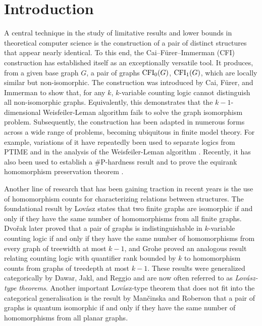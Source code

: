 \documentclass[11pt]{article}
\begin{document}
\section{Introduction}
A central technique in the study of limitative results and lower bounds in theoretical computer science is the construction of a pair of distinct structures that appear nearly identical.
To this end, the Cai–Fürer–Immerman (CFI) construction has established itself as an exceptionally versatile tool.
It produces, from a given base graph $G$, a pair of graphs $\operatorname{CFI}_0(G)$, $\operatorname{CFI}_1(G)$, which are locally similar but non-isomorphic.
The construction was introduced by Cai, Fürer, and Immerman \cite{cai1992optimal} to show that, for any $k$, $k$-variable counting logic cannot distinguish all non-isomorphic graphs.
Equivalently, this demonstrates that the $k-1$-dimensional Weisfeiler-Leman algorithm fails to solve the graph isomorphism problem.
Subsequently, the construction has been adapted in numerous forms across a wide range of problems, becoming ubiquitous in finite model theory.
For example, variations of it have repeatedly been used to separate logics from \textsf{PTIME} \cite{Dawar2007thepowerofcounting,gradel2019rank,lichter2023separating} and in the analysis of the Weisfeiler-Leman algorithm \cite{Furer2001weisfeiler, FUHLBRUCK202196, grohe2025compressing}. Recently, it has also been used to establish a \textsf{\#P}-hardness result \cite{DBLP:conf/soda/Curticapean24} and to prove the equirank homomorphism preservation theorem \cite{rossman:LIPIcs.CSL.2025.6}.
\par 
Another line of research that has been gaining traction in recent years is the use of homomorphism counts for characterizing relations between structures. The foundational result by Lovász \cite{lovasz1967operations} states that two finite graphs are isomorphic if and only if they have the same number of homomorphisms from all finite graphs. Dvořak \cite{dvovrak2010recognizing} later proved that a pair of graphs is indistinguishable in $k$-variable counting logic if and only if they have the same number of homomorphisms from every graph of treewidth at most $k-1$, and Grohe \cite{grohe2020counting} proved an analogous result relating counting logic with quantifier rank bounded by $k$ to homomorphism counts from graphs of treedepth at most $k-1$. These results were generalized categorically by Dawar, Jakl, and Reggio \cite{Dawar2021Lovasztype} and are now often referred to as \emph{Lovász-type theorems}. 
Another important Lovász-type theorem that does not fit into the categorical generalisation is the result by Mančinska and Roberson \cite{Mancinska2020:quantum} that a pair of graphs is quantum isomorphic if and only if they have the same number of homomorphisms from all planar graphs. 
\end{document}
